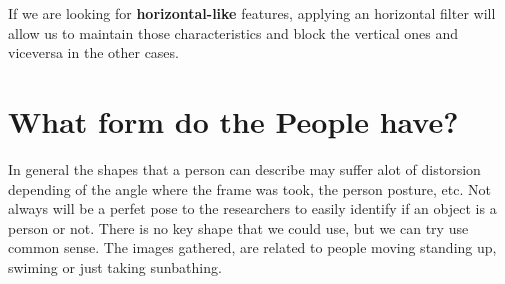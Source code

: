 \documentclass[10pt]{article}
\begin{document}
If we are looking for \textbf{horizontal-like} features, applying an horizontal filter will allow us to maintain those characteristics and block the vertical ones and viceversa in the other cases.


\section{What form do the People have?}

In general the shapes that a person can describe may suffer alot of distorsion depending of the angle where the frame was took, the person posture, etc. Not always will be a perfet pose to the researchers to easily identify if an object is a person or not. There is no key shape that we could use, but we can try use common sense. The images gathered, are related to people moving standing up, swiming or just taking sunbathing.
\end{document}

